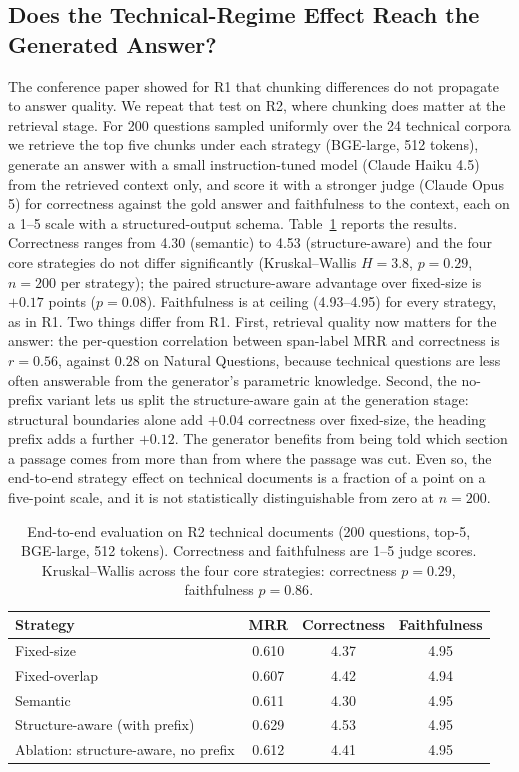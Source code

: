 \documentclass[runningheads]{llncs}
\begin{document}
\subsection{Does the Technical-Regime Effect Reach the Generated Answer?}
\label{sec:generation}
The conference paper showed for R1 that chunking differences do not propagate to answer quality. We repeat that test on R2, where chunking does matter at the retrieval stage. For 200 questions sampled uniformly over the 24 technical corpora we retrieve the top five chunks under each strategy (BGE-large, 512 tokens), generate an answer with a small instruction-tuned model (Claude Haiku 4.5) from the retrieved context only, and score it with a stronger judge (Claude Opus 5) for correctness against the gold answer and faithfulness to the context, each on a 1--5 scale with a structured-output schema. Table~\ref{tab:generation} reports the results. Correctness ranges from 4.30 (semantic) to 4.53 (structure-aware) and the four core strategies do not differ significantly (Kruskal--Wallis $H=3.8$, $p=0.29$, $n=200$ per strategy); the paired structure-aware advantage over fixed-size is $+0.17$ points ($p=0.08$). Faithfulness is at ceiling (4.93--4.95) for every strategy, as in R1. Two things differ from R1. First, retrieval quality now matters for the answer: the per-question correlation between span-label MRR and correctness is $r=0.56$, against $0.28$ on Natural Questions, because technical questions are less often answerable from the generator's parametric knowledge. Second, the no-prefix variant lets us split the structure-aware gain at the generation stage: structural boundaries alone add $+0.04$ correctness over fixed-size, the heading prefix adds a further $+0.12$. The generator benefits from being told which section a passage comes from more than from where the passage was cut. Even so, the end-to-end strategy effect on technical documents is a fraction of a point on a five-point scale, and it is not statistically distinguishable from zero at $n=200$.

\begin{table}[t]
\caption{End-to-end evaluation on R2 technical documents (200 questions, top-5, BGE-large, 512 tokens). Correctness and faithfulness are 1--5 judge scores. Kruskal--Wallis across the four core strategies: correctness $p=0.29$, faithfulness $p=0.86$.}
\label{tab:generation}
\centering
\begin{tabular}{lccc}
\toprule
Strategy & MRR & Correctness & Faithfulness \\
\midrule
Fixed-size & 0.610 & 4.37 & 4.95 \\
Fixed-overlap & 0.607 & 4.42 & 4.94 \\
Semantic & 0.611 & 4.30 & 4.95 \\
Structure-aware (with prefix) & 0.629 & 4.53 & 4.95 \\
\midrule
Ablation: structure-aware, no prefix & 0.612 & 4.41 & 4.95 \\
\bottomrule
\end{tabular}
\end{table}
\end{document}
